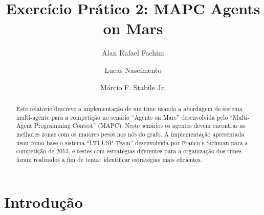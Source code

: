 \documentclass{llncs}
\begin{document}
\title{Exercício Prático 2: MAPC Agents on Mars}

\author{Alan Rafael Fachini \and Lucas Nascimento \and Márcio F. Stabile Jr.}

\maketitle

\begin{abstract}
Este relatório descreve a implementação de um time usando a abordagem de sistema multi-agente para a competição no senário ``Agents on Mars'' desenvolvida pelo ``Multi-Agent Programming Contest'' (MAPC). Neste senários os agentes devem encontrar as melhores zonas com os maiores pesos nos nós do grafo. A implementação apresentada usou como base o sistema ``LTI-USP Team'' desenvolvida por Franco e Sichman \cite{franco2013improving} para a competição de 2013, e testes com estratégias diferentes para a organização dos times foram realizados a fim de tentar identificar estratégias mais eficientes.
\end{abstract}

\section{Introdução}
\end{document}
